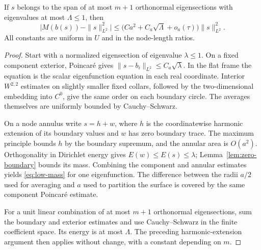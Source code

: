 \begin{lemma}\label{lem:low-mass}
If $s$ belongs to the span of at most $m+1$
orthonormal eigensections with eigenvalues at most
$\Lambda\le1$, then
\begin{equation}\label{eq:low-mass}
 \big|M(b(s))-\|s\|_{L^2}^2\big|
 \le\big(Ca^2+C_a\sqrt{\Lambda}+o_a(\tau)\big)
                 \|s\|_{L^2}^2.
\end{equation}
All constants are uniform in $U$ and in the node-length
ratios.
\end{lemma}
\begin{proof}
Start with a normalized eigensection of eigenvalue
$\lambda\le1$. On a fixed component exterior,
Poincar\'e gives $\|s-b_i\|_{L^2}\le C_a\sqrt\lambda$.
In the flat frame the equation is the scalar
eigenfunction equation in each real coordinate.
Interior $W^{2,2}$ estimates on slightly smaller
fixed collars, followed by the two-dimensional
embedding into $C^0$, give the same order on each
boundary circle. The averages themselves are uniformly
bounded by Cauchy--Schwarz.

On a node annulus write $s=h+w$, where $h$ is the
coordinatewise harmonic extension of its boundary
values and $w$ has zero boundary trace. The maximum
principle bounds $h$ by the boundary supremum, and
the annular area is $O(a^2)$. Orthogonality in
Dirichlet energy gives $E(w)\le E(s)\le\lambda$;
Lemma~\ref{lem:zero-boundary} bounds its mass.
Combining the component and annular estimates yields
\eqref{eq:low-mass} for one eigenfunction. The difference
between the radii $a/2$ used for averaging and $a$
used to partition the surface is covered by the same
component Poincar\'e estimate.

For a unit linear combination of at most $m+1$
orthonormal eigensections, sum the boundary and
exterior estimates and use Cauchy--Schwarz in the
finite coefficient space. Its energy is at most
$\Lambda$. The preceding harmonic-extension argument
then applies without change, with a constant depending
on $m$.
\end{proof}

